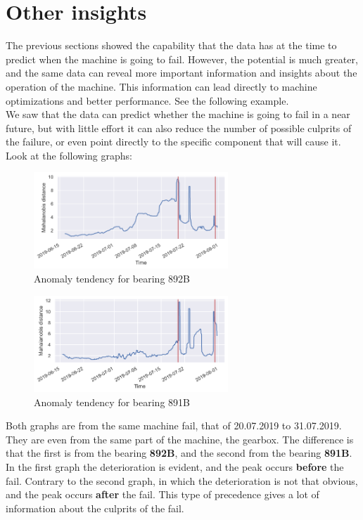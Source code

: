 \documentclass[11pt,twoside]{article}
\begin{document}
\section{Other insights}
The previous sections showed the capability that the data has at the time
to predict when the machine is going to fail. However, the potential is 
much greater, and the same data can reveal more important information and
insights about the operation of the machine. This information can lead
directly to machine optimizations and better performance. See the following
example.\\
We saw that the data can predict whether the machine is going to fail in a near 
future, but with little effort it can also reduce the number of possible 
culprits of the failure, or even point directly to the specific component that
will cause it. Look at the following graphs:\\
\begin{figure}[h!]
\centering
\includegraphics[width=0.65\textwidth]{precedence_1_label.png}
\caption{Anomaly tendency for bearing 892B}\label{screenshots}
\end{figure}
\begin{figure}[h!]
\centering
\includegraphics[width=0.65\textwidth]{precedence_2_label.png}
\caption{Anomaly tendency for bearing 891B}\label{screenshots}
\end{figure}
\newpage
Both graphs are from the same machine fail, that of 20.07.2019 to 31.07.2019. They are even from 
the same part of the machine, the gearbox. The difference is that the first is from the 
bearing \textbf{892B}, and the second from the bearing \textbf{891B}. In the first graph 
the deterioration is evident, and the peak occurs \textbf{before} the fail. Contrary 
to the second graph, in which the deterioration is not that obvious, and the peak occurs
\textbf{after} the fail. This type of precedence gives a lot of information about the
culprits of the fail.
\end{document}
